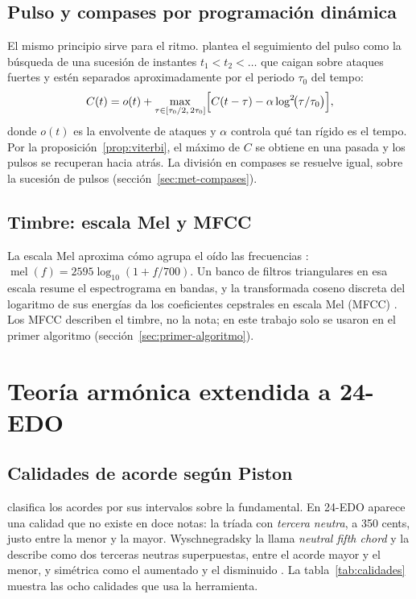 \subsection{Pulso y compases por programación dinámica}

El mismo principio sirve para el ritmo. \citet{ellis2007} plantea el seguimiento del pulso como la búsqueda de una
sucesión de instantes $t_1 < t_2 < \dots$ que caigan sobre ataques fuertes y estén separados aproximadamente por el
periodo $\tau_0$ del tempo:
\[
  C(t) = o(t) + \max_{\tau \in [\tau_0/2,\, 2\tau_0]} \Bigl[ C(t - \tau) - \alpha \log^2\!\bigl(\tau/\tau_0\bigr) \Bigr],
\]
donde $o(t)$ es la envolvente de ataques y $\alpha$ controla qué tan rígido es el tempo. Por la
proposición~\ref{prop:viterbi}, el máximo de $C$ se obtiene en una pasada y los pulsos se recuperan hacia atrás. La
división en compases se resuelve igual, sobre la sucesión de pulsos (sección~\ref{sec:met-compases}).

\subsection{Timbre: escala Mel y MFCC}

La escala Mel aproxima cómo agrupa el oído las frecuencias \citep{stevens1937}:
$\operatorname{mel}(f) = 2595 \log_{10}(1 + f/700)$. Un banco de filtros triangulares en esa escala resume el
espectrograma en bandas, y la transformada coseno discreta del logaritmo de sus energías da los coeficientes cepstrales
en escala Mel (MFCC) \citep{davis1980}. Los MFCC describen el timbre, no la nota; en este trabajo solo se usaron en el
primer algoritmo (sección~\ref{sec:primer-algoritmo}).

\section{Teoría armónica extendida a 24-EDO}\label{sec:armonia-teoria}

\subsection{Calidades de acorde según Piston}

\citet{piston1987} clasifica los acordes por sus intervalos sobre la fundamental. En 24-EDO aparece una calidad que no
existe en doce notas: la tríada con \emph{tercera neutra}, a 350 cents, justo entre la menor y la mayor. Wyschnegradsky
la llama \emph{neutral fifth chord} y la describe como dos terceras neutras superpuestas, entre el acorde mayor y el
menor, y simétrica como el aumentado y el disminuido
\citep[§16, p.~8]{wyschnegradsky2017}. La
tabla~\ref{tab:calidades} muestra las ocho calidades que usa la herramienta.

